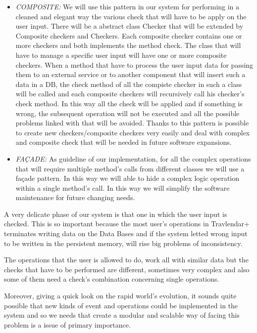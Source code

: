 \begin{itemize}
\item \emph{COMPOSITE:} We will use this pattern in our system for performing in a cleaned and elegant way the various check that will have to be apply on the user input. There will be a abstract class Checker that will be extended by Composite checkers and Checkers. Each composite checker contains one or more checkers and both implements the method check. The class that will have to manage a specific user input will have one or more composite checkers.
When a method that have to process the user input data for passing them to an external service or to another component that will insert such a data in a DB, the check method of all the compiste checker in such a class will be called and each composite checkers will recursively call his checker’s check method. In this way all the check will be applied and if something is wrong, the subsequent operation will not be executed and all the possible problems linked with that will be avoided. 
Thanks to this pattern is possible to create new checkers/composite checkers very easily and deal with complex and composite check that will be needed in future software expansions.

\item \emph{FAÇADE:} As guideline of our implementation, for all the complex operations that will require multiple method’s calls from different classes we will use a façade pattern. In this way we will able to hide a complex logic operation within a single method’s call. In this way we will simplify the software maintenance for future changing needs.
\end{itemize}

A very delicate phase of our system is that one in which the user input is checked. This is so important because the most user’s operations in Travlendar+ terminates writing data on the Data Bases and if the system letted wrong input to be written in the persistent memory, will rise big problems of inconsistency.

The operations that the user is allowed to do, work all with similar data but the checks that have to be performed are different, sometimes very complex and also some of them need a check’s combination concerning single operations.

Moreover, giving a quick look on the rapid world’s evolution, it sounds quite possible that new kinds of event and operations could be implemented in the system and so we needs that create a modular and scalable way of facing this problem is a issue of primary importance.

